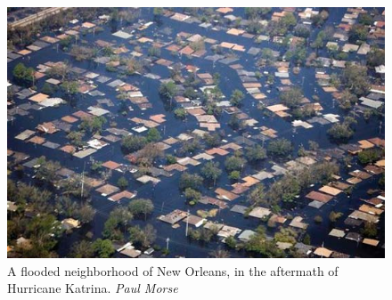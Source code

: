 \begin{figure}
	\centering
	\includegraphics[width=\linewidth]{images/katrina_flooding_paul_morse.jpg}
	\caption{A flooded neighborhood of New Orleans, in the aftermath of Hurricane Katrina. \textit{Paul Morse}}
	\label{fig:katrina_flooding}
\end{figure}